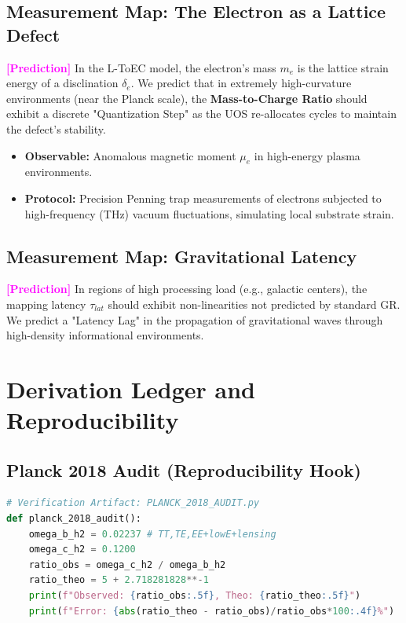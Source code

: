 \documentclass[11pt,titlepage]{article}
\newcommand{\tagpred}{\textcolor{magenta}{\textbf{[Prediction]}} }
\begin{document}
\subsection{Measurement Map: The Electron as a Lattice Defect}
\tagpred In the L-ToEC model, the electron's mass $m_e$ is the lattice strain energy of a disclination $\delta_e$. We predict that in extremely high-curvature environments (near the Planck scale), the \textbf{Mass-to-Charge Ratio} should exhibit a discrete "Quantization Step" as the UOS re-allocates cycles to maintain the defect's stability.
\begin{itemize}
    
\item \textbf{Observable:} Anomalous magnetic moment $\mu_e$ in high-energy plasma environments.
    
\item \textbf{Protocol:} Precision Penning trap measurements of electrons subjected to high-frequency (THz) vacuum fluctuations, simulating local substrate strain.
\end{itemize}

\subsection{Measurement Map: Gravitational Latency}
\tagpred In regions of high processing load (e.g., galactic centers), the mapping latency $\tau_{lat}$ should exhibit non-linearities not predicted by standard GR. We predict a "Latency Lag" in the propagation of gravitational waves through high-density informational environments.

\section{Derivation Ledger and Reproducibility}

\subsection{Planck 2018 Audit (Reproducibility Hook)}
\begin{lstlisting}[language=Python]
# Verification Artifact: PLANCK_2018_AUDIT.py
def planck_2018_audit():
    omega_b_h2 = 0.02237 # TT,TE,EE+lowE+lensing
    omega_c_h2 = 0.1200
    ratio_obs = omega_c_h2 / omega_b_h2
    ratio_theo = 5 + 2.718281828**-1
    print(f"Observed: {ratio_obs:.5f}, Theo: {ratio_theo:.5f}")
    print(f"Error: {abs(ratio_theo - ratio_obs)/ratio_obs*100:.4f}%")
\end{lstlisting}
\end{document}
